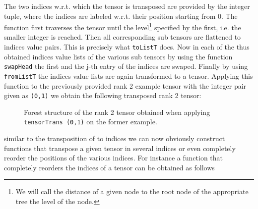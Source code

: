 \documentclass[a4paper,12pt, DIV=14, BCOR=5mm, twoside, headsepline]{scrbook}
\begin{document}
The two indices w.r.t. which the tensor is transposed are provided by the integer tuple, where the indices are labeled w.r.t. their position starting from 0. The function first traverses the tensor until the level\footnote{We will call the distance of a given node to the root node of the appropriate tree the level of the node.} specified by the first, i.e. the smaller integer is reached. Then all corresponding sub tensors are flattened to indices value pairs. This is precisely what \texttt{toListT} does. Now in each of the thus obtained indices value lists of the various sub tensors by using the function \texttt{swapHead} the first and the j-th entry of the indices are swaped. Finally by using  \texttt{fromListT} the indices value lists are again transformed to a tensor.  Applying this function to the previously provided rank 2 example tensor with the integer pair given as \texttt{(0,1)} we obtain the following transposed rank 2 tensor:
\begin{figure}[ht]
\centering
{}
\caption{Forest structure of the rank 2 tensor obtained when applying \texttt{tensorTrans (0,1)} on the former example.}
\label{ExampleTensTrans}
\end{figure}
similar to the transposition of to indices we can now obviously construct functions that transpose a given tensor in several indices or even completely reorder the positions of the various indices.  For instance a function that completely reorders the indices of a tensor can be obtained as follows
\end{document}
